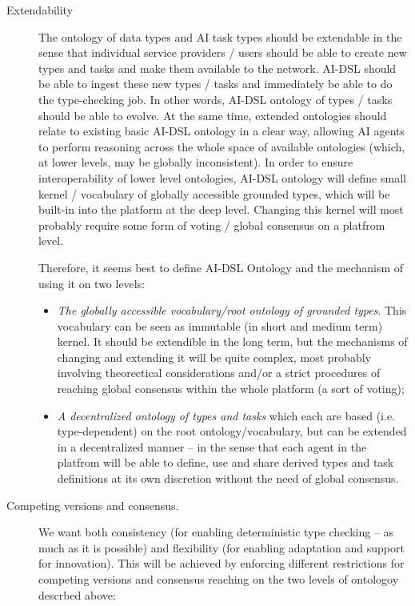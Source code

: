 \documentclass[]{report}
\begin{document}
\begin{description}
  \item[Extendability] The ontology of data types and AI task types should be extendable in the sense that individual service providers / users should be able to create new types and tasks and make them available to the network. AI-DSL should be able to ingest these new types / tasks and immediately be able to do the type-checking job. In other words, AI-DSL ontology of types / tasks should be able to evolve. At the same time, extended ontologies should relate to existing basic AI-DSL ontology in a clear way, allowing AI agents to perform reasoning across the whole space of available ontologies (which, at lower levels, may be globally inconsistent). In order to ensure interoperability of lower level ontologies, AI-DSL ontology will define small kernel / vocabulary of globally accessible grounded types, which will be built-in into the platform at the deep level. Changing this kernel will most probably require some form of voting / global consensus on a platfrom level.

  Therefore, it seems best to define AI-DSL Ontology and the mechanism of using it on two levels:
  \begin{itemize}
    \item \textit{The globally accessible vocabulary/root ontology of grounded types}. This vocabulary can be seen as immutable (in short and medium term) kernel. It should be extendible in the long term, but the mechanisms of changing and extending it will be quite complex, most probably involving theorectical considerations and/or a strict procedures of reaching global consensus within the whole platform (a sort of voting);
    \item \textit{A decentralized ontology of types and tasks} which each are based (i.e. type-dependent) on the root ontology/vocabulary, but can be extended in a decentralized manner -- in the sense that each agent in the platfrom will be able to define, use and share derived types and task definitions at its own discretion without the need of global consensus.
  \end{itemize}

  \item[Competing versions and consensus.] We want both consistency (for enabling deterministic type checking -- as much as it is possible) and flexibility (for enabling adaptation and support for innovation). This will be achieved by enforcing different restrictions for competing versions and consensus reaching on the two levels of ontologoy descrbed above:


\end{description}
\end{document}
